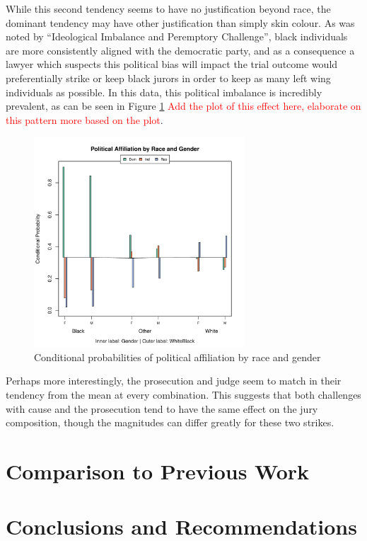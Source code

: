 \documentclass{article}
\begin{document}
While this second tendency seems to have no justification beyond race, the dominant tendency may have other justification than
simply skin colour. As was noted by ``Ideological Imbalance and Peremptory Challenge'', black individuals are more consistently
aligned with the democratic party, and as a consequence a lawyer which suspects this political bias will impact the trial outcome
would preferentially strike or keep black jurors in order to keep as many left wing individuals as possible. In this data, this
political imbalance is incredibly prevalent, as can be seen in Figure \ref{fig:racepolitics} \textcolor{red}{Add the plot of this
  effect here, elaborate on this pattern more based on the plot}.

\begin{figure}[!h]
  \centering
  \includegraphics[width=0.7\textwidth]{Plots/RaceGenderPolit}
  \caption{Conditional probabilities of political affiliation by race and gender}
  \label{fig:racepolitics}
\end{figure}

Perhaps more interestingly, the prosecution and judge seem to match in their tendency from the mean at every combination. This
suggests that both challenges with cause and the prosecution tend to have the same effect on the jury composition, though the
magnitudes can differ greatly for these two strikes.

\section{Comparison to Previous Work} \label{sec:comparison}

\section{Conclusions and Recommendations} \label{sec:conclusion}
\end{document}
